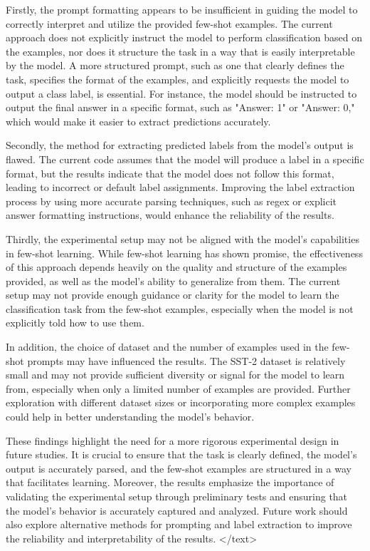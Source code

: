 \documentclass{article}
\begin{document}
Firstly, the prompt formatting appears to be insufficient in guiding the model to correctly interpret and utilize the provided few-shot examples. The current approach does not explicitly instruct the model to perform classification based on the examples, nor does it structure the task in a way that is easily interpretable by the model. A more structured prompt, such as one that clearly defines the task, specifies the format of the examples, and explicitly requests the model to output a class label, is essential. For instance, the model should be instructed to output the final answer in a specific format, such as "Answer: 1" or "Answer: 0," which would make it easier to extract predictions accurately.

Secondly, the method for extracting predicted labels from the model's output is flawed. The current code assumes that the model will produce a label in a specific format, but the results indicate that the model does not follow this format, leading to incorrect or default label assignments. Improving the label extraction process by using more accurate parsing techniques, such as regex or explicit answer formatting instructions, would enhance the reliability of the results.

Thirdly, the experimental setup may not be aligned with the model's capabilities in few-shot learning. While few-shot learning has shown promise, the effectiveness of this approach depends heavily on the quality and structure of the examples provided, as well as the model's ability to generalize from them. The current setup may not provide enough guidance or clarity for the model to learn the classification task from the few-shot examples, especially when the model is not explicitly told how to use them.

In addition, the choice of dataset and the number of examples used in the few-shot prompts may have influenced the results. The SST-2 dataset is relatively small and may not provide sufficient diversity or signal for the model to learn from, especially when only a limited number of examples are provided. Further exploration with different dataset sizes or incorporating more complex examples could help in better understanding the model's behavior.

These findings highlight the need for a more rigorous experimental design in future studies. It is crucial to ensure that the task is clearly defined, the model's output is accurately parsed, and the few-shot examples are structured in a way that facilitates learning. Moreover, the results emphasize the importance of validating the experimental setup through preliminary tests and ensuring that the model's behavior is accurately captured and analyzed. Future work should also explore alternative methods for prompting and label extraction to improve the reliability and interpretability of the results.
</text>
\end{document}
